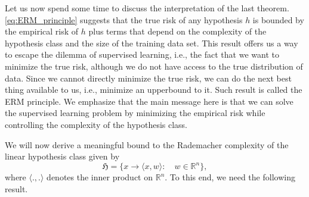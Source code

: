 \begin{rmk}
	Let us now spend some time to discuss the interpretation of the last theorem.
	\eqref{eq:ERM_principle} suggests that the true risk of any hypothesis $h$ is
	bounded by the empirical risk of $h$ plus terms that depend on the complexity
	of the hypothesis class and the size of the training data set. This result
	offers us a way to escape the dilemma of supervised learning, i.e., the fact
	that we want to minimize the true risk, although we do not have access to the
	true distribution of data. Since we cannot directly minimize the true risk, we
	can do the next best thing available to us, i.e., minimize an upperbound to it.
	Such result is called the ERM principle. We emphasize that the main message here
	is that we can solve the supervised learning problem by minimizing the empirical
	risk while controlling the complexity of the hypothesis class.		
\end{rmk}

We will now derive a meaningful bound to the Rademacher complexity of the
linear hypothesis class given by 
$$
\mathfrak{H} = \{x \to \langle x, w \rangle: \quad w \in  \mathbb{R}^n\},
$$
where $\langle., . \rangle$ denotes the inner product on $\mathbb{R}^n$. To this
end, we need the following result.

